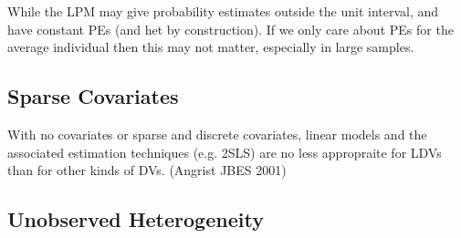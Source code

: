 \documentclass[DIV=14,titlepage=false]{scrreprt}
\begin{document}
While the LPM may give probability estimates outside the unit interval, and have constant PEs (and het by construction). If we only care about PEs for the average individual then this may not matter, especially in large samples.

\subsection{Sparse Covariates}
With no covariates or sparse and discrete covariates, linear models and the associated estimation techniques (e.g. 2SLS) are no less appropraite for LDVs than for other kinds of DVs. (Angrist JBES 2001)
\subsection{Unobserved Heterogeneity}
\end{document}
